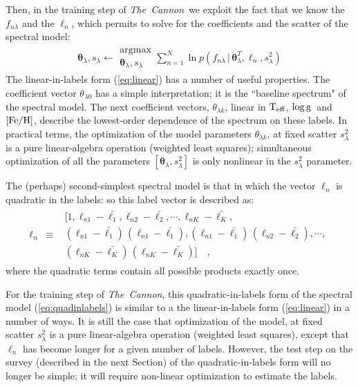 \documentclass[12pt, preprint]{aastex}
\newcommand{\tc}{\textsl{The~Cannon}}
\newcommand{\set}[1]{\bm{#1}}
\newcommand{\starlabel}{\ell}
\newcommand{\starlabelvec}{\set{\starlabel}}
\newcommand{\given}{\,|\,}
\newcommand{\teff}{\mbox{$\rm T_{eff}$}}
\newcommand{\feh}{\mbox{$\rm [Fe/H]$}}
\newcommand{\logg}{\mbox{$\rm \log g$}}
\begin{document}
Then, in the training step of \tc\ we exploit the fact that we know the $f_{n\lambda}$
and the $\starlabelvec_n$, which permits to solve for the coefficients and the scatter of the spectral model:
\begin{eqnarray}
\set{\theta}_\lambda,s_\lambda \leftarrow \substack{\mbox{argmax}\\{\set{\theta}_\lambda}, s_\lambda}
\sum_{n=1}^N \ln p(f_{n\lambda}\given\set{\theta}^T_\lambda, \starlabelvec_n, s_\lambda^2)
\label{eq:trainingstep}
\end{eqnarray}
The linear-in-labels form (\ref{eq:linear}) has a number of useful properties.
The coefficient vector $\theta_{\lambda 0}$ has a simple interpretation;
it is the ``baseline spectrum" of the spectral model. 
The next coefficient vectors,  $\theta_{\lambda k}$, linear in \teff , \logg ~and \feh,
describe the lowest-order dependence of the spectrum on these labels.
In practical terms, the optimization of the model parameters $\theta_{\lambda k}$, at fixed scatter
$s_\lambda^2$ is a pure linear-algebra operation (weighted least
squares); simultaneous optimization of all the parameters
$[\set{\theta}_\lambda,s_\lambda^2]$ is only nonlinear in the $s_\lambda^2$
parameter.

The (perhaps) second-simplest spectral model is that in which the
vector $\starlabelvec_n$ is quadratic in the labels: so this label vector is described as:
\begin{eqnarray}
\starlabelvec_n &\equiv& \begin{array}{l}[1,
                          \starlabel_{n1} - \bar{\starlabel_1},
                          \starlabel_{n2} - \bar{\starlabel_2},
                          \cdots,
                          \starlabel_{nK} - \bar{\starlabel_K},\\
                          (\starlabel_{n1} - \bar{\starlabel_1})\,(\starlabel_{n1} - \bar{\starlabel_1}),
                          (\starlabel_{n1} - \bar{\starlabel_1})\,(\starlabel_{n2} - \bar{\starlabel_2}),
                          \cdots,\\
                          (\starlabel_{nK} - \bar{\starlabel_K})\,(\starlabel_{nK} - \bar{\starlabel_K})]\quad ,
\end{array}
\label{eq:quadinlabels}
\end{eqnarray}
where the quadratic terms contain all possible products exactly once.

For the training step of \tc , this quadratic-in-labels form of the spectral model (\ref{eq:quadinlabels}) is similar to a the linear-in-labels form (\ref{eq:linear}) in a number
of ways.
It is still the case that optimization of the model, at fixed scatter
$s_\lambda^2$ is a pure linear-algebra operation (weighted least
squares), except that $\starlabelvec_n$ has become longer for a given number of labels. 
However, the test step on the survey (described in the next Section) of the quadratic-in-labels form
 will no longer be simple; it will require non-linear
optimization to estimate the labels.
\end{document}
